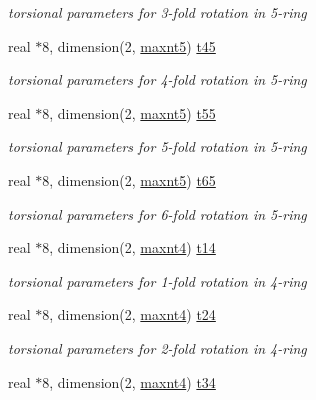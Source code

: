 \begin{DoxyCompactItemize}
\begin{DoxyCompactList}\small\item\em torsional parameters for 3-\/fold rotation in 5-\/ring \end{DoxyCompactList}\item 
real $\ast$8, dimension(2, \hyperlink{classktorsn_a0391ba344c3a8a876ef6d3853b8e1a10}{maxnt5}) \hyperlink{classktorsn_a2988d45f665461f7ab069c1dfa4eb678}{t45}
\begin{DoxyCompactList}\small\item\em torsional parameters for 4-\/fold rotation in 5-\/ring \end{DoxyCompactList}\item 
real $\ast$8, dimension(2, \hyperlink{classktorsn_a0391ba344c3a8a876ef6d3853b8e1a10}{maxnt5}) \hyperlink{classktorsn_a555cbb3dd71f3c017278e95f991e15c7}{t55}
\begin{DoxyCompactList}\small\item\em torsional parameters for 5-\/fold rotation in 5-\/ring \end{DoxyCompactList}\item 
real $\ast$8, dimension(2, \hyperlink{classktorsn_a0391ba344c3a8a876ef6d3853b8e1a10}{maxnt5}) \hyperlink{classktorsn_a9b6d6b807ba85aa929a34f59935d6aff}{t65}
\begin{DoxyCompactList}\small\item\em torsional parameters for 6-\/fold rotation in 5-\/ring \end{DoxyCompactList}\item 
real $\ast$8, dimension(2, \hyperlink{classktorsn_a5a45df497069015a810999bb1fab9abe}{maxnt4}) \hyperlink{classktorsn_a12d6c1b9173ca22ab13c01fca7e04853}{t14}
\begin{DoxyCompactList}\small\item\em torsional parameters for 1-\/fold rotation in 4-\/ring \end{DoxyCompactList}\item 
real $\ast$8, dimension(2, \hyperlink{classktorsn_a5a45df497069015a810999bb1fab9abe}{maxnt4}) \hyperlink{classktorsn_a8f9efc19540fa5cf15d01432d6f0fe57}{t24}
\begin{DoxyCompactList}\small\item\em torsional parameters for 2-\/fold rotation in 4-\/ring \end{DoxyCompactList}\item 
real $\ast$8, dimension(2, \hyperlink{classktorsn_a5a45df497069015a810999bb1fab9abe}{maxnt4}) \hyperlink{classktorsn_a02592239a1249618f195b4bafd9b653c}{t34}

\end{DoxyCompactItemize}

